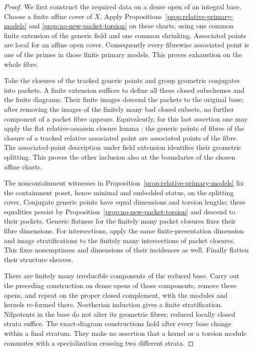 \begin{proof}
We first construct the required data on a dense open of an integral
base.  Choose a finite affine cover of \(X\).  Apply
Propositions~\ref{prop:relative-primary-models} and
\ref{prop:no-new-packet-torsion} on these charts, using one common
finite extension of the generic field and one common shrinking.
Associated points are local for an affine open cover.  Consequently
every fibrewise associated point is one of the primes in those finite
primary models.  This proves exhaustion on the whole fibre.

Take the closures of the tracked generic points and group geometric
conjugates into packets.  A finite extension suffices to define all
these closed subschemes and the finite diagrams.  Their finite images
descend the packets to the original base; after removing the images
of the finitely many bad closed subsets, no further component of a
packet fibre appears.  Equivalently, for this last assertion one may
apply the flat relative-assassin closure lemma
\cite[Tag 0GSJ]{StacksFlatRelativeAssassin}: the generic points of
fibres of the closure of a tracked relative associated point are
associated points of the fibre.  The associated-point description
under field extension \cite[Tag 05AS]{StacksRelativeAssassin}
identifies their geometric splitting.  This proves the other
inclusion also at the boundaries of the chosen affine charts.

The noncontainment witnesses in
Proposition~\ref{prop:relative-primary-models} fix the containment
poset, hence minimal and embedded status, on the splitting cover.
Conjugate generic points have equal dimensions and torsion lengths;
these equalities persist by Proposition~\ref{prop:no-new-packet-torsion}
and descend to their packets.  Generic flatness for the finitely many
packet closures fixes their fibre dimensions.  For intersections,
apply the same finite-presentation dimension and image stratifications
to the finitely many intersections of packet closures.  This fixes
nonemptiness and dimensions of their incidences as well.  Finally
flatten their structure sheaves.

There are finitely many irreducible components of the reduced base.
Carry out the preceding construction on dense opens of those
components, remove these opens, and repeat on the proper closed
complement, with the modules and kernels re-formed there.  Noetherian
induction gives a finite stratification.  Nilpotents in the base do
not alter its geometric fibres; reduced locally closed strata suffice.
The exact-diagram constructions hold after every base change within
a final stratum.  They make no assertion that a kernel or a torsion
module commutes with a specialization crossing two different strata.
\end{proof}

